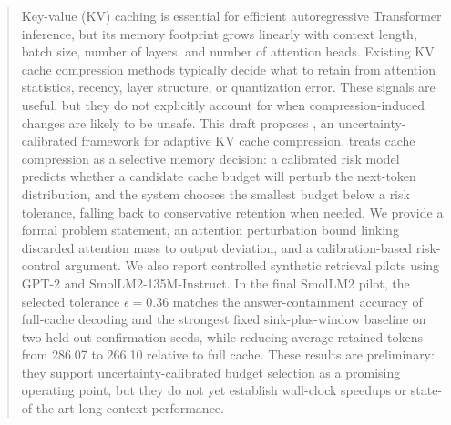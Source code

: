 \begin{abstract}
Key-value (KV) caching is essential for efficient autoregressive Transformer inference, but its memory footprint grows linearly with context length, batch size, number of layers, and number of attention heads. Existing KV cache compression methods typically decide what to retain from attention statistics, recency, layer structure, or quantization error. These signals are useful, but they do not explicitly account for when compression-induced changes are likely to be unsafe. This draft proposes \uckv{}, an uncertainty-calibrated framework for adaptive KV cache compression. \uckv{} treats cache compression as a selective memory decision: a calibrated risk model predicts whether a candidate cache budget will perturb the next-token distribution, and the system chooses the smallest budget below a risk tolerance, falling back to conservative retention when needed. We provide a formal problem statement, an attention perturbation bound linking discarded attention mass to output deviation, and a calibration-based risk-control argument. We also report controlled synthetic retrieval pilots using GPT-2 and SmolLM2-135M-Instruct. In the final SmolLM2 pilot, the selected tolerance $\epsilon=0.36$ matches the answer-containment accuracy of full-cache decoding and the strongest fixed sink-plus-window baseline on two held-out confirmation seeds, while reducing average retained tokens from 286.07 to 266.10 relative to full cache. These results are preliminary: they support uncertainty-calibrated budget selection as a promising operating point, but they do not yet establish wall-clock speedups or state-of-the-art long-context performance.
\end{abstract}
